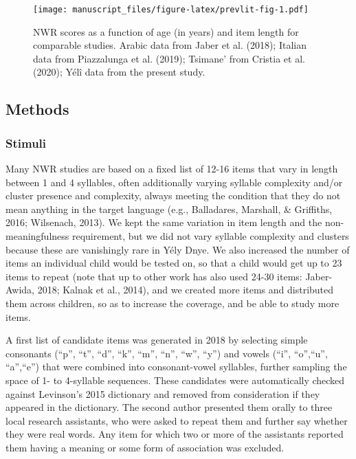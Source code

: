 \documentclass[english,,man,floatsintext]{apa6}
\begin{document}
\begin{figure}
\centering
\texttt{[image: manuscript\_files/figure-latex/prevlit-fig-1.pdf]}
\caption{\label{fig:prevlit-fig}NWR scores as a function of age (in years)
and item length for comparable studies. Arabic data from Jaber et al.
(2018); Italian data from Piazzalunga et al. (2019); Tsimane' from
Cristia et al. (2020); Yélî data from the present study.}
\end{figure}

\subsection{Methods}\label{methods}

\subsubsection{Stimuli}\label{stimuli}

Many NWR studies are based on a fixed list of 12-16 items that vary in
length between 1 and 4 syllables, often additionally varying syllable
complexity and/or cluster presence and complexity, always meeting the
condition that they do not mean anything in the target language (e.g.,
Balladares, Marshall, \& Griffiths, 2016; Wilsenach, 2013). We kept the
same variation in item length and the non-meaningfulness requirement,
but we did not vary syllable complexity and clusters because these are
vanishingly rare in Yély Dnye. We also increased the number of items an
individual child would be tested on, so that a child would get up to 23
items to repeat (note that up to other work has also used 24-30 items:
Jaber-Awida, 2018; Kalnak et al., 2014), and we created more items and
distributed them across children, so as to increase the coverage, and be
able to study more items.

A first list of candidate items was generated in 2018 by selecting
simple consonants (``p'', ``t'', ``d'', ``k'', ``m'', ``n'', ``w'',
``y'') and vowels (``i'', ``o'',``u'', ``a'',``e'') that were combined
into consonant-vowel syllables, further sampling the space of 1- to
4-syllable sequences. These candidates were automatically checked
against Levinson's 2015 dictionary and removed from consideration if
they appeared in the dictionary. The second author presented them orally
to three local research assistants, who were asked to repeat them and
further say whether they were real words. Any item for which two or more
of the assistants reported them having a meaning or some form of
association was excluded.
\end{document}
